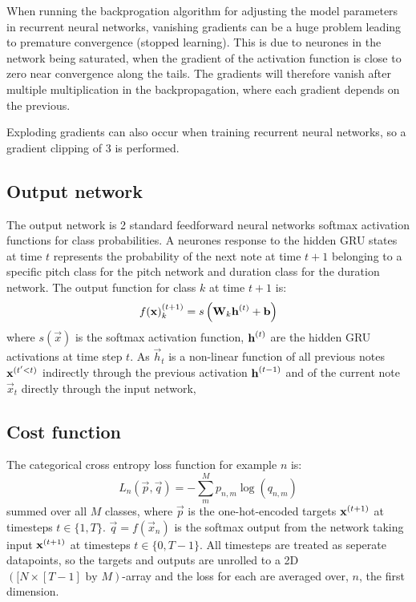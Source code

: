 	When running the backprogation algorithm for adjusting the model parameters in recurrent neural networks, vanishing gradients can be a huge problem leading to premature convergence (stopped learning). This is due to neurones in the network being saturated, when the gradient of the activation function is close to zero near convergence along the tails. The gradients will therefore vanish after multiple multiplication in the backpropagation, where each gradient depends on the previous. 

	Exploding gradients can also occur when training recurrent neural networks, so a gradient clipping of 3 is performed.  

\subsection{Output network} %
\label{sub:output_network}
	The output network is 2 standard feedforward neural networks softmax activation functions for class probabilities. A neurones response to the hidden GRU states at time $t$ represents the probability of the next note at time $t+1$ belonging to a specific pitch class for the pitch network and duration class for the duration network.   
	The output function for class $k$ at time $t+1$ is:
	\begin{equation}
		f(\vec{x})\order{t+1}_k = s\left(\mat{W}_k \vec{h}\order{t} + \vec{b}\right)%
	\end{equation}
	where $s(\vec{x})$ is the softmax activation function, $\bm{\mathrm{h}}^{(t)}$ are the hidden GRU activations at time step $t$. As $\vec{h}_t$ is a non-linear function of all previous notes $\bm{\mathrm{x}}^{(t'<t)}$ indirectly through the previous activation $\bm{\mathrm{h}}^{(t-1)}$ and of the current note $\vec{x}_t$ directly through the input network,    
	
	\subsection{Cost function} 
	The categorical cross entropy loss function for example $n$ is:
	\begin{equation}
		L_n(\vec{p}, \vec{q}) = -\sum^{M}_{m} p_{n,m} \log (q_{n,m})
	\end{equation}
	summed over all $M$ classes, where $\vec{p}$ is the one-hot-encoded targets $\bm{\mathrm{x}}^{(t+1)}$ at timesteps $t\in\{1, T\}$. $\vec{q}=f(\vec{x}_n)$ is the softmax output from the network taking input $\bm{\mathrm{x}}^{(t+1)}$ at timesteps $t\in\{0, T-1\}$. All timesteps are treated as seperate datapoints, so the targets and outputs are unrolled to a 2D $([N \times [T-1] \text{ by } M)$-array and the loss for each are averaged over, $n$, the first dimension.

